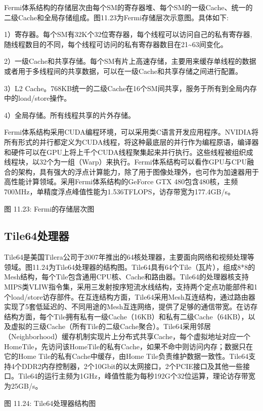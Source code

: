 \documentclass[]{ctexbook}
\begin{document}
Fermi体系结构的存储层次由每个SM的寄存器堆、每个SM的一级Cache、统一的二级Cache和全局存储组成。图11.23为Fermi存储层次示意图。具体如下:

1）寄存器。每个SM有32K个32位寄存器，每个线程可以访问自己的私有寄存器,随线程数目的不同，每个线程可访问的私有寄存器数目在21\textasciitilde63间变化。

2）一级Cache和共享存储。每个SM有片上高速存储，主要用来缓存单线程的数据或者用于多线程间的共享数据，可以在一级Cache和共享存储之间进行配置。

3）L2 Cache。768KB统一的二级Cache在16个SM间共享，服务于所有到全局内存中的load/store操作。

4）全局存储。所有线程共享的片外存储。

Fermi体系结构采用CUDA编程环境，可以采用类C语言开发应用程序。NVIDIA将所有形式的并行都定义为CUDA线程，将这种最底层的并行作为编程原语，编译器和硬件可以在GPU上将上千个CUDA线程聚集起来并行执行。这些线程被组织成线程块，以32个为一组（Warp）来执行。Fermi体系结构可以看作GPU与CPU融合的架构，具有强大的浮点计算能力，除了用于图像处理外，也可作为加速器用于高性能计算领域。采用Fermi体系结构的GeForce GTX 480包含480核，主频700MHz，单精度浮点峰值性能为1.536TFLOPS，访存带宽为177.4GB/s。

图 11.23: Fermi的存储层次图

\hypertarget{tile64ux5904ux7406ux5668}{%
\subsection{Tile64处理器}\label{tile64ux5904ux7406ux5668}}

Tile64是美国Tilera公司于2007年推出的64核处理器，主要面向网络和视频处理等领域。图11.24为Tile64处理器的结构图。Tile64具有64个Tile（瓦片），组成8*8的Mesh结构，每个Tile包含通用CPU核、Cache和路由器。Tile64的处理器核支持MIPS类VLIW指令集，采用三发射按序短流水线结构，支持两个定点功能部件和1个load/store访存部件。在互连结构方面，Tile64采用Mesh互连结构，通过路由器实现了5套低延迟的、不同用途的Mesh互连网络，提供了足够的通信带宽。在访存结构方面，每个Tile拥有私有一级Cache（16KB）和私有二级Cache（64KB），以及虚拟的三级Cache（所有Tile的二级Cache聚合）。Tile64采用邻居（Neighborhood）缓存机制实现片上分布式共享Cache，每个虚拟地址对应一个HomeTile，先访问该HomeTile的私有Cache，如果不命中则访问内存；数据只在它的Home Tile的私有Cache中缓存，由Home Tile负责维护数据一致性。Tile64支持4个DDR2内存控制器，2个10Gbit的以太网接口，2个PCIE接口及其他一些接口。Tile64的运行主频为1GHz，峰值性能为每秒192G个32位运算，理论访存带宽为25GB/s。

图 11.24: Tile64处理器结构图
\end{document}
